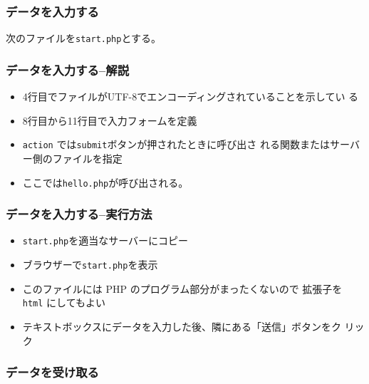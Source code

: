 

\frame{\maketitle}
\begin{frame}[containsverbatim]
 \frametitle{データを入力する}
 次のファイルを\texttt{start.php}とする。
\end{frame}
\begin{frame}[containsverbatim]
 \frametitle{データを入力する--解説}
 \begin{itemize}
	\item 4行目でファイルがUTF-8でエンコーディングされていることを示してい
				る
	\item 8行目から11行目で入力フォームを定義
  \item \texttt{action} では\texttt{submit}ボタンが押されたときに呼び出さ
       れる関数またはサーバー側のファイルを指定
	\item ここでは\texttt{hello.php}が呼び出される。
 \end{itemize}
\end{frame}
\begin{frame}[containsverbatim]
 \frametitle{データを入力する--実行方法}
 \begin{itemize}
  \item \texttt{start.php}を適当なサーバーにコピー
  \item ブラウザーで\texttt{start.php}を表示
  \item このファイルには PHP のプログラム部分がまったくないので
       拡張子を \texttt{html} にしてもよい
  \item テキストボックスにデータを入力した後、隣にある「送信」ボタンをク
       リック
 \end{itemize}
\end{frame}
\begin{frame}[containsverbatim]
 \frametitle{データを受け取る}
\end{frame}

